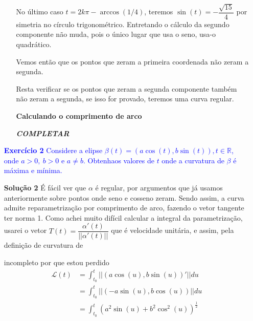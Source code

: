 \documentclass[12pt,letterpaper]{article}
\newcommand\lcur{\mathcal{L}}
\newcommand{\ex}[1]{\textcolor{blue}{\textbf{Exercício #1}}}
\newcommand{\sol}[1]{\textbf{Solução #1}}
\newcommand{\blue}[1]{{\color{blue}{#1}}}
\begin{document}
\begin{enumerate}
\begin{itemize}
	No último caso $t=2k\pi-\arccos(1/4)$, teremos $\sin(t)=-\dfrac{\sqrt{15}}4$ por simetria no círculo trigonométrico. Entretando o cálculo da segundo componente não muda, pois o único lugar que usa o seno, usa-o quadrático.
	
	Vemos então que os pontos que zeram a primeira coordenada não zeram a segunda.
	
	Resta verificar se os pontos que zeram a segunda componente também não zeram a segunda, se isso for provado, teremos uma curva regular.
	
	\textbf{Calculando o comprimento de arco}
	
	{\Huge{\textbf{\textit{COMPLETAR}}}}
	
		\blue{
			\item (catenária) $\alpha(t)=(t,\cosh(t)),t\in\mathbb{R}$
	}
		\end{itemize}
	
		\item[\ex{2}] \textcolor{blue}{Considere a elipse $\beta(t) =(a\cos(t),b\sin(t)),t\in\mathbb{R}$, onde $a >0,~b >0$ e $a\neq b$. Obtenhaos valores de $t$ onde a curvatura de $\beta$ é máxima e mínima.}
		
		\item[\sol{2}] É fácil ver que $\alpha$ é regular, por argumentos que já usamos anteriormente sobre pontos onde seno e cosseno zeram. Sendo assim, a curva admite reparametrização por comprimento de arco, fazendo o vetor tangente ter norma 1. Como achei muito difícil calcular a integral da parametrização, usarei o vetor  $T(t)=\dfrac{\alpha'(t)}{||\alpha'(t)||}$ que é velocidade unitária, e assim, pela definição de curvatura de \cite{pressley2001elementary} 
		
		
		incompleto por que estou perdido
		\begin{align*}
			\lcur(t)&=\int_{t_0}^t||(a\cos(u),b\sin(u))'||du\\
			&=\int_{t_0}^t||(-a\sin(u),b\cos(u))||du\\
			&=\int_{t_0}^t\left(a^2\sin(u)+b^2\cos^2(u)\right)^{\frac12}
		\end{align*}
		
		
		
		
		
		
	\end{enumerate}
	
	\newpage
	
	
	
\end{document}
